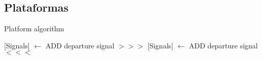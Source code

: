 \subsection{Plataformas}

\lipsum[1]

\begin{algorithm}[hbt!]
            \caption{Platform algorithm}\label{alg:PTF}
            \DontPrintSemicolon
            \SetNoFillComment
            \LinesNotNumbered 
            {
                [Signals] $\gets$ ADD departure signal $>>>$\;
                [Signals] $\gets$ ADD departure signal $<<<$\;
            }
            \KwResult{[Signals]} 
        \end{algorithm}